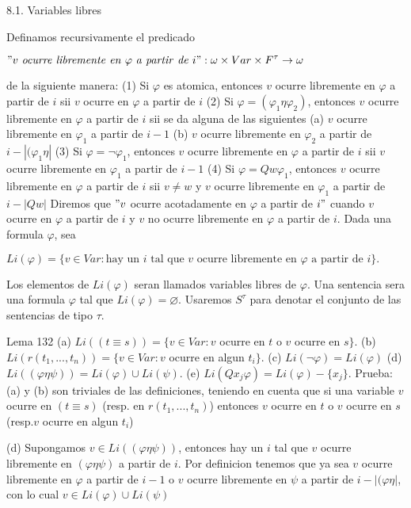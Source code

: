 8.1. Variables libres

Definamos recursivamente el predicado

\(\displaystyle "v\mathit{\ ocurre\ libremente\ en\ }\varphi \mathit{\ a\ partir\ de\ } i":\omega \times Var\times F^{\tau }\rightarrow \omega \)

de la siguiente manera:
(1) Si \(\varphi \) es atomica, entonces \(v\) ocurre libremente en \( \varphi \) a partir de \(i\) sii \(v\) ocurre en \(\varphi \) a partir de \(i\)
(2) Si \(\varphi =(\varphi _{1}\eta \varphi _{2})\), entonces \(v\) ocurre libremente en \(\varphi \) a partir de \(i\) sii se da alguna de las siguientes
(a) \(v\) ocurre libremente en \(\varphi _{1}\) a partir de \(i-1\)
(b) \(v\) ocurre libremente en \(\varphi _{2}\) a partir de \(i-\left\vert (\varphi _{1}\eta \right\vert \)
(3) Si \(\varphi =\lnot \varphi _{1}\), entonces \(v\) ocurre libremente en \(\varphi \) a partir de \(i\) sii \(v\) ocurre libremente en \(\varphi _{1}\) a partir de \(i-1\)
(4) Si \(\varphi =Qw\varphi _{1}\), entonces \(v\) ocurre libremente en \( \varphi \) a partir de \(i\) sii \(v\neq w\) y \(v\) ocurre libremente en \(\varphi _{1}\) a partir de \(i-\left\vert Qw\right\vert \)
Diremos que \("v\) ocurre acotadamente en \(\varphi \) a partir de \(i"\) cuando \(v\) ocurre en \(\varphi \) a partir de \(i\) y \(v\) no ocurre libremente en \(\varphi \) a partir de \(i\). Dada una formula \(\varphi \), sea

\(\displaystyle Li(\varphi )=\{v\in Var:\text{hay un }i\text{ tal que }v\text{ ocurre libremente en }\varphi \text{ a partir de }i\}\text{.} \)

Los elementos de \(Li(\varphi )\) seran llamados variables libres de \( \varphi \). Una sentencia sera una formula \(\varphi \) tal que \( Li(\varphi )=\varnothing \). Usaremos \(S^{\tau }\) para denotar el conjunto de las sentencias de tipo \(\tau \).

Lema 132
(a) \(Li((t\equiv s))=\{v\in Var:v\) ocurre en \(t\) o \(v\) ocurre en \( s\}. \)
(b) \(Li(r(t_{1},...,t_{n}))=\{v\in Var:v\) ocurre en algun \(t_{i}\}.\)
(c) \(Li(\lnot \varphi )=Li(\varphi )\)
(d) \(Li((\varphi \eta \psi ))=Li(\varphi )\cup Li(\psi ).\)
(e) \(Li(Qx_{j}\varphi )=Li(\varphi )-\{x_{j}\}.\)
Prueba: (a) y (b) son triviales de las definiciones, teniendo en cuenta que si una variable \(v\) ocurre en \((t\equiv s)\) (resp. en \(r(t_{1},...,t_{n})\)) entonces \(v\) ocurre en \(t\) o \(v\) ocurre en \(s\) (resp.\(v\) ocurre en algun \( t_{i}\))

(d) Supongamos \(v\in Li((\varphi \eta \psi ))\), entonces hay un \(i\) tal que \( v\) ocurre libremente en \((\varphi \eta \psi )\) a partir de \(i\). Por definicion tenemos que ya sea \(v\) ocurre libremente en \(\varphi \) a partir de \(i-1\) o \(v\) ocurre libremente en \(\psi \) a partir de \(i-\left\vert (\varphi \eta \right\vert \), con lo cual \(v\in Li(\varphi )\cup Li(\psi )\)

